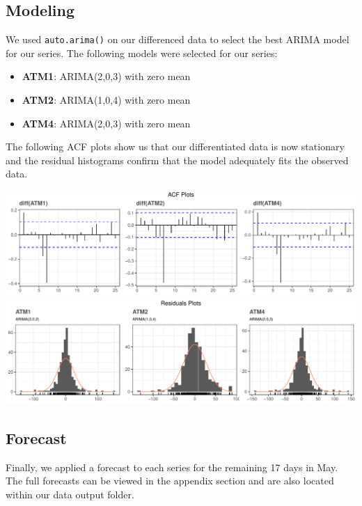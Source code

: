 \documentclass[openany]{book}
\providecommand{\tightlist}{%
  \setlength{\itemsep}{0pt}\setlength{\parskip}{0pt}}
\begin{document}
\hypertarget{modeling}{%
\subsection{Modeling}\label{modeling}}

We used \texttt{auto.arima()} on our differenced data to select the best
ARIMA model for our series. The following models were selected for our
series:

\begin{itemize}
\tightlist
\item
  \textbf{ATM1}: ARIMA(2,0,3) with zero mean
\item
  \textbf{ATM2}: ARIMA(1,0,4) with zero mean
\item
  \textbf{ATM4}: ARIMA(2,0,3) with zero mean
\end{itemize}

The following ACF plots show us that our differentiated data is now
stationary and the residual histograms confirm that the model adequately
fits the observed data.

\includegraphics{Part-A-JM_files/figure-latex/unnamed-chunk-6-1.pdf}
\includegraphics{Part-A-JM_files/figure-latex/unnamed-chunk-6-2.pdf}

\hypertarget{forecast}{%
\subsection{Forecast}\label{forecast}}

Finally, we applied a forecast to each series for the remaining 17 days
in May. The full forecasts can be viewed in the appendix section and are
also located within our data output folder.
\end{document}
